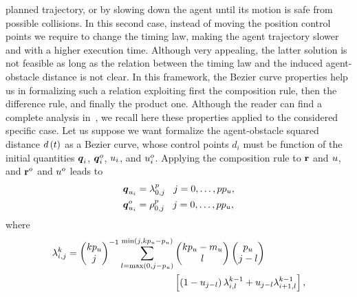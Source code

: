 planned trajectory, or by slowing down the agent until its motion is safe from possible collisions.
In this second case, instead of moving the position control points we require to change the timing law, making the agent trajectory slower
and with a higher execution time. Although very appealing, the latter solution is not feasible as long as the relation between
the timing law and the induced agent-obstacle distance is not clear.
In this framework, the B\acuteacc ezier curve properties help us in formalizing such a relation exploiting first the composition rule,
then the difference rule, and finally the product one. Although the reader can find a complete analysis in~,
we recall here these properties applied to the considered specific case.
Let us suppose we want formalize the agent-obstacle squared distance $d \left( t \right)$ as a B\acuteacc ezier curve, whose control points $d_i$ must
be function of the initial quantities $\boldsymbol{q}_i$, $\boldsymbol{q}_i^o$, $u_i$, and $u_i^o$.
Applying the composition rule to $\mathbf{r}$ and $u$, and $\mathbf{r}^o$ and $u^o$ leads to
\begin{equation}%
    \label{EQ:ST-BEZIER-COMPOSITION-A}
    \begin{split}
        \bs{\cpoint}_{\splinevar_i} & = \lambda_{0,j}^{\order} \hspace{0.3cm} j = 0, \dots, \order \order_{\splinevar}, \\
        \bs{\cpoint}_{\splinevar_i}^o & = \rho_{0,j}^{\order} \hspace{0.3cm} j = 0, \dots, \order \order_{\splinevar},
    \end{split}
\end{equation}
where
\begin{equation}%
    \label{EQ:ST-BEZIER-COMPOSITION-B}
    \begin{split}
        \lambda_{i,j}^k =
        \begin{pmatrix}
            k \order_{\splinevar} \\ j
        \end{pmatrix}^{-1}
        \sum_{l = \max \lp 0, j - \order_{\splinevar} \rp}^{\min \lp j, k \order_{\splinevar} - \order_{\splinevar} \rp} &
        \begin{pmatrix}
            k \order_{\splinevar} - \cpnumber_u \\ l
        \end{pmatrix}
        \begin{pmatrix}
            \order_{\splinevar} \\ j-l
        \end{pmatrix} \\
        & \lps \lp 1-\splinevar_{j-l} \rp \lambda_{i,l}^{k-1} + \splinevar_{j-l}\lambda_{i+1,l}^{k-1} \rps,
    \end{split}
\end{equation}

